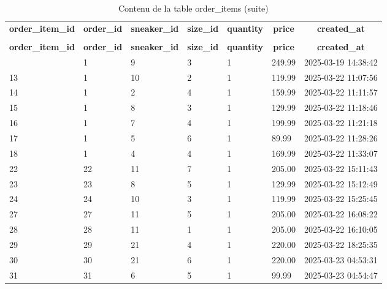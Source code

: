 %
%
 \begin{longtable}{|l|l|l|l|l|l|l|} 
 \hline \endhead \hline \endfoot \hline 
 \caption{Contenu de la table order\_items} \label{tab:order_items-data} \\\hline \multicolumn{1}{|c|}{\textbf{order\_item\_id}} & \multicolumn{1}{|c|}{\textbf{order\_id}} & \multicolumn{1}{|c|}{\textbf{sneaker\_id}} & \multicolumn{1}{|c|}{\textbf{size\_id}} & \multicolumn{1}{|c|}{\textbf{quantity}} & \multicolumn{1}{|c|}{\textbf{price}} & \multicolumn{1}{|c|}{\textbf{created\_at}} \\ \hline \hline  \endfirsthead 
\caption{Contenu de la table order\_items (suite)} \\ \hline \multicolumn{1}{|c|}{\textbf{order\_item\_id}} & \multicolumn{1}{|c|}{\textbf{order\_id}} & \multicolumn{1}{|c|}{\textbf{sneaker\_id}} & \multicolumn{1}{|c|}{\textbf{size\_id}} & \multicolumn{1}{|c|}{\textbf{quantity}} & \multicolumn{1}{|c|}{\textbf{price}} & \multicolumn{1}{|c|}{\textbf{created\_at}} \\ \hline \hline \endhead \endfoot
1 & 1 & 9 & 3 & 1 & 249.99 & 2025-03-19 14:38:42 \\ \hline 
13 & 1 & 10 & 2 & 1 & 119.99 & 2025-03-22 11:07:56 \\ \hline 
14 & 1 & 2 & 4 & 1 & 159.99 & 2025-03-22 11:11:57 \\ \hline 
15 & 1 & 8 & 3 & 1 & 129.99 & 2025-03-22 11:18:46 \\ \hline 
16 & 1 & 7 & 4 & 1 & 199.99 & 2025-03-22 11:21:18 \\ \hline 
17 & 1 & 5 & 6 & 1 & 89.99 & 2025-03-22 11:28:26 \\ \hline 
18 & 1 & 4 & 4 & 1 & 169.99 & 2025-03-22 11:33:07 \\ \hline 
22 & 22 & 11 & 7 & 1 & 205.00 & 2025-03-22 15:11:43 \\ \hline 
23 & 23 & 8 & 5 & 1 & 129.99 & 2025-03-22 15:12:49 \\ \hline 
24 & 24 & 10 & 3 & 1 & 119.99 & 2025-03-22 15:25:45 \\ \hline 
27 & 27 & 11 & 5 & 1 & 205.00 & 2025-03-22 16:08:22 \\ \hline 
28 & 28 & 11 & 1 & 1 & 205.00 & 2025-03-22 16:10:05 \\ \hline 
29 & 29 & 21 & 4 & 1 & 220.00 & 2025-03-22 18:25:35 \\ \hline 
30 & 30 & 21 & 6 & 1 & 220.00 & 2025-03-23 04:53:31 \\ \hline 
31 & 31 & 6 & 5 & 1 & 99.99 & 2025-03-23 04:54:47 \\ \hline 

\end{longtable}
